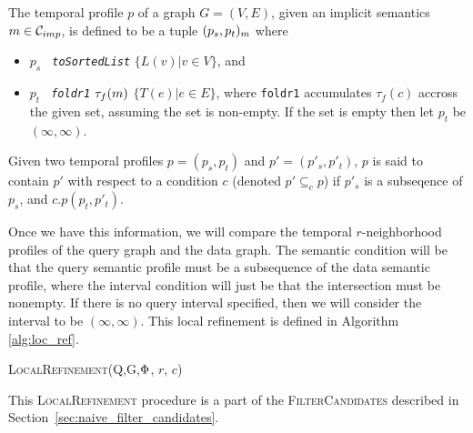 \begin{defn}
  The temporal profile $p$ of a graph $G = (V,E)$, given an implicit semantics
  $m \in \mathcal{C}_{imp}$, is defined to be a tuple $(p_s, p_t)_{m}$ where
  \begin{itemize}
  \item $p_s$ \emph{\assign \, \texttt{toSortedList}} \; $\{L(v) | v \in V \}$,
    and
  \item $p_t$ \emph{\assign \, \texttt{foldr1}} \; $\tau_f(m)$ \; $\{T(e) | e
    \in E\}$, where \texttt{foldr1} accumulates $\tau_f(c)$ accross the given
    set, assuming the set is non-empty. If the set is empty then let $p_t$ be
    $(\infty,\infty)$.
  \end{itemize}

  Given two temporal profiles $p = (p_s, p_t)$ and $p' = (p'_s, p'_t)$, $p$ is
  said to contain $p'$ with respect to a condition $c$ (denoted $p' \subseteq_c
  p$) if $p'_s$ is a subseqence of $p_s$, and $c.p(p_t, p'_t)$.
\end{defn}

Once we have this information, we will compare the temporal $r$-neighborhood
profiles of the query graph and the data graph. The semantic condition will be
that the query semantic profile must be a subsequence of the data semantic
profile, where the interval condition will just be that the intersection must be
nonempty.  If there is no query interval specified, then we will consider the
interval to be $(\infty, \infty)$. This local refinement is defined in Algorithm
\ref{alg:loc_ref}.

\begin{algorithm}
  \label{alg:loc_ref}
  \caption{\textsc{LocalRefinement(Q,G,$\Phi$, $r$, $c$)}}
  \SetAlgoLined

\end{algorithm}

This \textsc{LocalRefinement} procedure is a part of the
\textsc{FilterCandidates} described in
Section~\ref{sec:naive_filter_candidates}.


